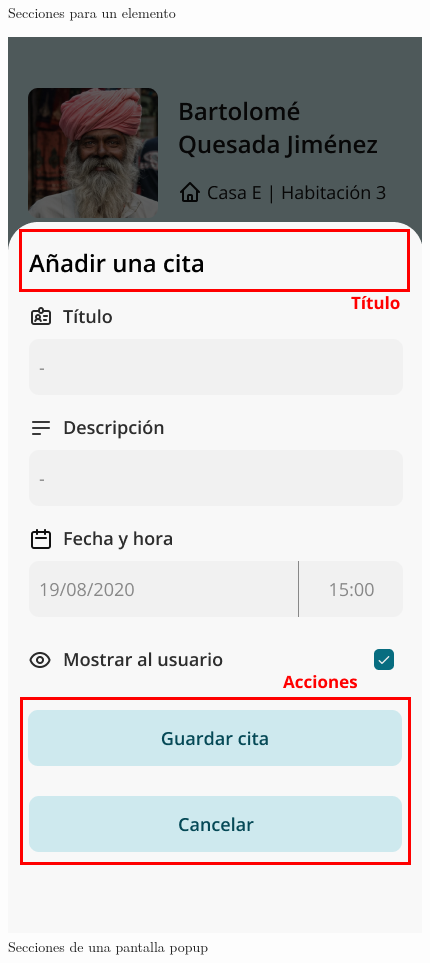 \begin{figure}[h!]
        \caption{Secciones para un elemento}
        \label{fig:secciones-elemento}
    \endminipage\hfill
        \centering
        \includegraphics[width=\linewidth]{diseno/app/presentacion/secciones-popup.png}
        \caption{Secciones de una pantalla popup}
        \label{fig:secciones-popup}
    \endminipage
\end{figure}

